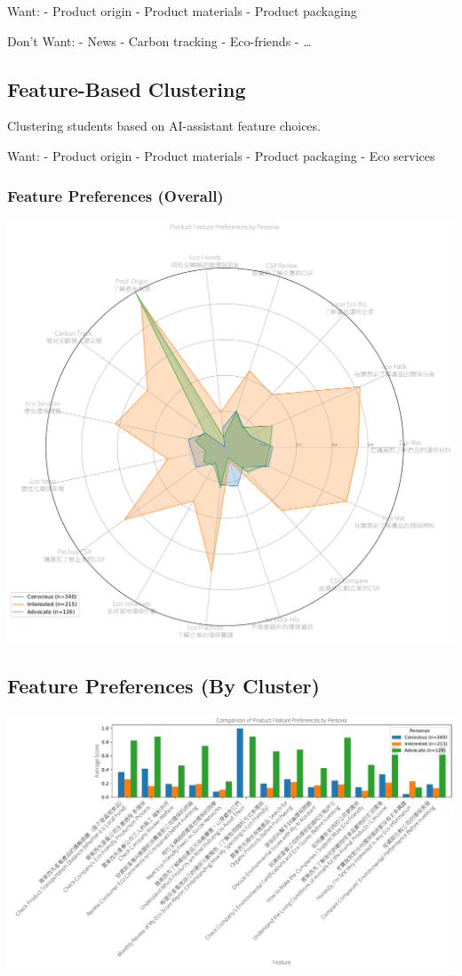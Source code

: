 \documentclass[
  letterpaper,
  DIV=11,
  numbers=noendperiod]{scrartcl}
\begin{document}
Want: - Product origin - Product materials - Product packaging

Don't Want: - News - Carbon tracking - Eco-friends - \ldots{}

\subsection{Feature-Based Clustering}\label{feature-based-clustering}

Clustering students based on AI-assistant feature choices.

Want: - Product origin - Product materials - Product packaging - Eco
services

\subsubsection{Feature Preferences
(Overall)}\label{feature-preferences-overall}

\includegraphics{_thesis_files/figure-pdf/cell-92-output-1.pdf}

\subsection{Feature Preferences (By
Cluster)}\label{feature-preferences-by-cluster}

\includegraphics{_thesis_files/figure-pdf/cell-93-output-1.pdf}
\end{document}
